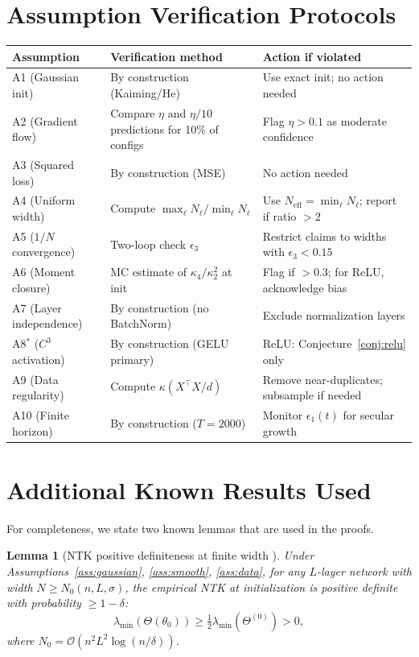 \documentclass[11pt]{article}
\newtheorem{lemma}[theorem]{Lemma}
\theoremstyle{definition}
\newcommand{\cO}{\mathcal{O}}
\renewcommand{\Theta}{\varTheta}
\begin{document}
\section{Assumption Verification Protocols}
\label{app:assumptions}

\begin{center}
\begin{tabular}{@{}p{2.5cm}p{4.5cm}p{5cm}@{}}
\toprule
Assumption & Verification method & Action if violated \\
\midrule
A1 (Gaussian init) & By construction (Kaiming/He) & Use exact init; no action needed \\
A2 (Gradient flow) & Compare $\eta$ and $\eta/10$ predictions for 10\% of configs & Flag $\eta > 0.1$ as moderate confidence \\
A3 (Squared loss) & By construction (MSE) & No action needed \\
A4 (Uniform width) & Compute $\max_\ell N_\ell / \min_\ell N_\ell$ & Use $N_{\mathrm{eff}} = \min_\ell N_\ell$; report if ratio $> 2$ \\
A5 ($1/N$ convergence) & Two-loop check $\epsilon_3$ & Restrict claims to widths with $\epsilon_3 < 0.15$ \\
A6 (Moment closure) & MC estimate of $\kappa_4/\kappa_2^2$ at init & Flag if $> 0.3$; for ReLU, acknowledge bias \\
A7 (Layer independence) & By construction (no BatchNorm) & Exclude normalization layers \\
A8$^*$ ($C^3$ activation) & By construction (GELU primary) & ReLU: Conjecture~\ref{conj:relu} only \\
A9 (Data regularity) & Compute $\kappa(X^\top X/d)$ & Remove near-duplicates; subsample if needed \\
A10 (Finite horizon) & By construction ($T = 2000$) & Monitor $\epsilon_1(t)$ for secular growth \\
\bottomrule
\end{tabular}
\end{center}

\section{Additional Known Results Used}
\label{app:known-results}

For completeness, we state two known lemmas that are used in the proofs.

\begin{lemma}[NTK positive definiteness at finite width {\citep{du2019gradient,nguyen2021tight}}]
\label{lem:ntk-pd}
Under Assumptions~\ref{ass:gaussian}, \ref{ass:smooth}, \ref{ass:data}, for any $L$-layer network with width $N \ge N_0(n, L, \sigma)$, the empirical NTK at initialization is positive definite with probability $\ge 1 - \delta$:
\begin{equation}
\lambda_{\min}(\Theta(\theta_0)) \ge \tfrac{1}{2}\lambda_{\min}(\Theta^{(0)}) > 0,
\end{equation}
where $N_0 = \cO(n^2 L^2 \log(n/\delta))$.
\end{lemma}
\end{document}
